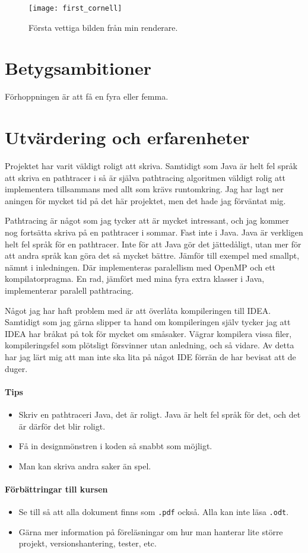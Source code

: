 \documentclass{article}
\begin{document}
\begin{figure}
  \begin{center}
  \texttt{[image: first\_cornell]}
  \caption{Första vettiga bilden från min renderare.}
  \end{center}
\end{figure}


\section{Betygsambitioner}
Förhoppningen är att få en fyra eller femma.

\section{Utvärdering och erfarenheter}
Projektet har varit väldigt roligt att skriva. Samtidigt som Java är
helt fel språk att skriva en pathtracer i så är själva pathtracing
algoritmen väldigt rolig att implementera tillsammans med allt som
krävs runtomkring. Jag har lagt ner aningen för mycket tid på det här
projektet, men det hade jag förväntat mig.

Pathtracing är något som jag tycker att är mycket intressant, och jag
kommer nog fortsätta skriva på en pathtracer i sommar. Fast inte i
Java. Java är verkligen helt fel språk för en pathtracer. Inte för att
Java gör det jättedåligt, utan mer för att andra språk kan göra det så
mycket bättre. Jämför till exempel med smallpt, nämnt i
inledningen. Där implementeras paralellism med OpenMP och ett
kompilatorpragma. En rad, jämfört med mina fyra extra klasser i Java,
implementerar paralell pathtracing.

Något jag har haft problem med är att överlåta kompileringen till
IDEA. Samtidigt som jag gärna slipper ta hand om kompileringen själv
tycker jag att IDEA har bråkat på tok för mycket om småsaker. Vägrar
kompilera vissa filer, kompileringsfel som plötsligt försvinner utan
anledning, och så vidare. Av detta har jag lärt mig att man inte ska
lita på något IDE förrän de har bevisat att de duger.

\paragraph{Tips}
\begin{itemize}
\item Skriv en pathtraceri Java, det är roligt. Java är helt fel språk för
  det, och det är därför det blir roligt.
\item Få in designmönstren i koden så snabbt som möjligt.
\item Man kan skriva andra saker än spel.
\end{itemize}

\paragraph{Förbättringar till kursen}
\begin{itemize}
\item Se till så att alla dokument finns som
  \texttt{.pdf} också. Alla kan inte läsa \texttt{.odt}.
\item Gärna mer information på föreläsningar om hur man hanterar lite
  större projekt, versionshantering, tester, etc.
\end{itemize}
\end{document}

